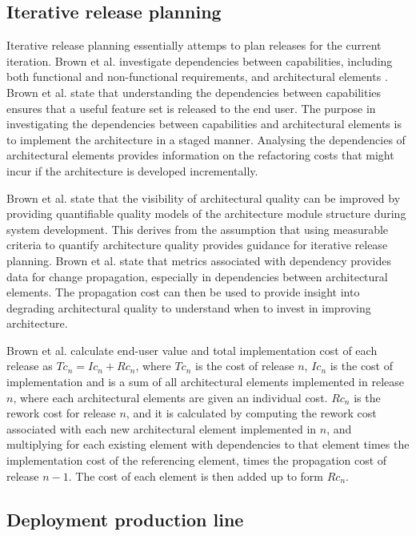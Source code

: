 \documentclass[conference]{IEEEtran}
\begin{document}
\subsection{Iterative release planning}

Iterative release planning essentially attemps to plan releases for the current iteration. Brown et al. investigate dependencies between capabilities, including both functional and non-functional requirements, and architectural elements \cite{brown2011analysis}. Brown et al. state that understanding the dependencies between capabilities ensures that a useful feature set is released to the end user. The purpose in investigating the dependencies between capabilities and architectural elements is to implement the architecture in a staged manner. Analysing the dependencies of architectural elements provides information on the refactoring costs that might incur if the architecture is developed incrementally.

Brown et al. state that the visibility of architectural quality can be improved by providing quantifiable quality models of the architecture module structure during system development. This derives from the assumption that using measurable criteria to quantify architecture quality provides guidance for iterative release planning. Brown et al. state that metrics associated with dependency provides data for change propagation, especially in dependencies between architectural elements. The propagation cost can then be used to provide insight into degrading architectural quality to understand when to invest in improving architecture.

Brown et al. calculate end-user value and total implementation cost of each release as $Tc_n = Ic_n + Rc_n$, where $Tc_n$ is the cost of release $n$, $Ic_n$ is the cost of implementation and is a sum of all architectural elements implemented in release $n$, where each architectural elements are given an individual cost. $Rc_n$ is the rework cost for release $n$, and it is calculated by computing the rework cost associated with each new architectural element implemented in $n$, and multiplying for each existing element with dependencies to that element times the implementation cost of the referencing element, times the propagation cost of release $n-1$. The cost of each element is then added up to form $Rc_n$.

\subsection{Deployment production line}
\end{document}

